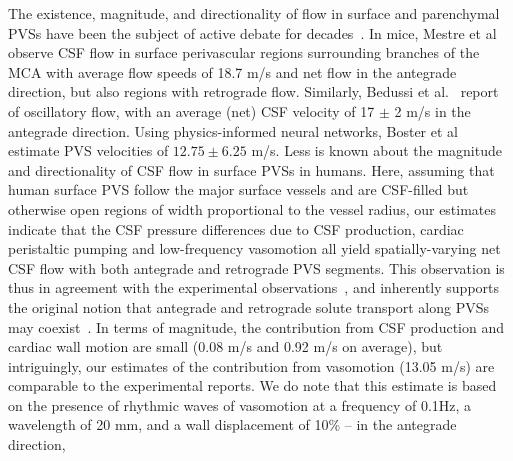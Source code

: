 \documentclass[fleqn,10pt]{wlscirep}
\begin{document}
The existence, magnitude, and directionality of flow in surface and
parenchymal PVSs have been the subject of active debate for
decades~\cite{rennels1985evidence, bilston2003arterial,
  hadaczek2006perivascular, carare2008solutes, iliff2012paravascular,
  iliff2013cerebral, bakker2016lymphatic, mestre2018flow,
  bedussi2018paravascular, rey2018pulsatile, thomas2019fluid,
  daversin2020mechanisms, kedarasetti2020functional,
  martinac2021phase, vanveluw2020vasomotion, bohr2022glymphatic,
  boster2023artificial, gjerde2023directional,
  nozaleda2024arterial}. In mice, Mestre et al~\cite{mestre2018flow}
observe CSF flow in surface perivascular regions surrounding branches
of the MCA with average flow speeds of 18.7 \textmu m/s and net flow
in the antegrade direction, but also regions with retrograde
flow. Similarly, Bedussi et al.~\cite{bedussi2018paravascular} report
of oscillatory flow, with an average (net) CSF velocity of 17 $\pm$ 2
\textmu m/s in the antegrade direction. Using physics-informed neural
networks, Boster et al~\cite{boster2023artificial} estimate PVS
velocities of $12.75 \pm 6.25$ \textmu m/s. Less is known about the
magnitude and directionality of CSF flow in surface PVSs in
humans. Here, assuming that human surface PVS follow the major surface
vessels and are CSF-filled but otherwise open regions of width
proportional to the vessel radius, our estimates indicate that the CSF
pressure differences due to CSF production, cardiac peristaltic
pumping and low-frequency vasomotion all yield spatially-varying net
CSF flow with both antegrade and retrograde PVS segments. This
observation is thus in agreement with the experimental
observations~\cite{mestre2018flow, bedussi2018paravascular}, and
inherently supports the original notion that antegrade and retrograde
solute transport along PVSs may coexist~\cite{rennels1985evidence}. In
terms of magnitude, the contribution from CSF production and cardiac
wall motion are small (0.08 \textmu m/s and 0.92 \textmu m/s on
average), but intriguingly, our estimates of the contribution from
vasomotion (13.05 \textmu m/s) are comparable to the experimental
reports. We do note that this estimate is based on the presence of
rhythmic waves of vasomotion at a frequency of 0.1Hz, a wavelength of
20 mm, and a wall displacement of 10\% -- in the antegrade direction,
\end{document}
